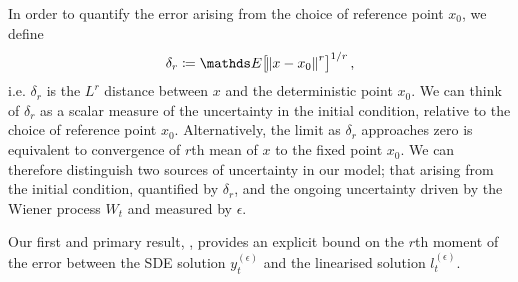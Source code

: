 
In order to quantify the error arising from the choice of reference point \(x_0\), we define
\[
	\delta_r \coloneqq \avg{\norm{x - x_0}^r}^{1/r},
\]
i.e. \(\delta_r\) is the \(L^r\) distance between \(x\) and the deterministic point \(x_0\).
We can think of \(\delta_r\) as a scalar measure of the uncertainty in the initial condition, relative to the choice of reference point \(x_0\).
Alternatively, the limit as \(\delta_r\) approaches zero is equivalent to convergence of \(r\)th mean of \(x\) to the fixed point \(x_0\).
We can therefore distinguish two sources of uncertainty in our model; that arising from the initial condition, quantified by \(\delta_r\), and the ongoing uncertainty driven by the Wiener process \(W_t\) and measured by \(\epsilon\).

Our first and primary result, , provides an explicit bound on the \(r\)th moment of the error between the SDE solution \(y_t^{(\epsilon)}\) and the linearised solution \(l_t^{(\epsilon)}\).

